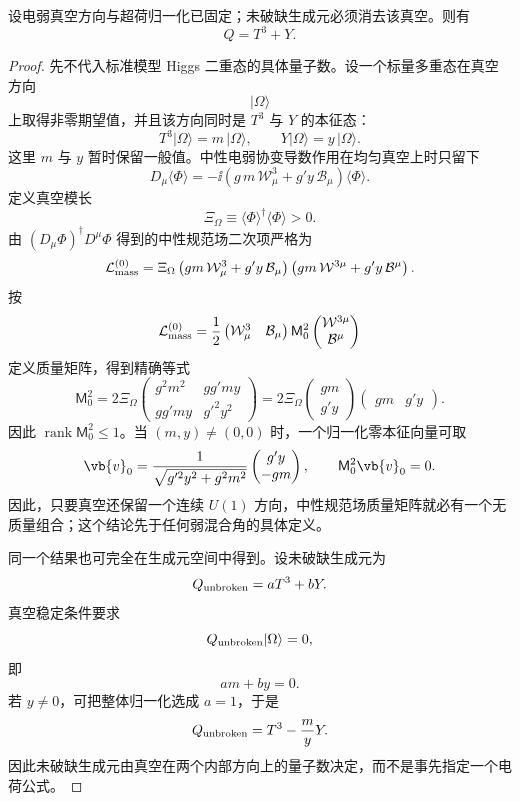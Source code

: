 \begin{proposition}[真空稳定子的电荷生成元]
设电弱真空方向与超荷归一化已固定；未破缺生成元必须消去该真空。则有
\begin{equation}
 {Q=T^3+Y.}
\label{eq:gm-nishijima-sm-dp11}
\end{equation}
\end{proposition}
\begin{proof}
先不代入标准模型 Higgs 二重态的具体量子数。设一个标量多重态在真空方向
\[
|\Omega\rangle
\]
上取得非零期望值，并且该方向同时是 \(T^3\) 与 \(Y\) 的本征态：
\[
T^3|\Omega\rangle
=
m\,|\Omega\rangle,
\qquad
Y|\Omega\rangle
=
y\,|\Omega\rangle.
\]
这里 \(m\) 与 \(y\) 暂时保留一般值。中性电弱协变导数作用在均匀真空上时只留下
\[
D_\mu\langle\Phi\rangle
=
-\ii
\left(
g\,m\,\mathcal W_\mu^3
+
g' y\,\mathcal B_\mu
\right)
\langle\Phi\rangle.
\]
定义真空模长
\[
\Xi_\Omega\equiv
\langle\Phi\rangle^\dagger\langle\Phi\rangle>0.
\]
由
\(
(D_\mu\Phi)^\dagger D^\mu\Phi
\)
得到的中性规范场二次项严格为
\[
\mathcal L_{\rm mass}^{(0)}
=\Xi_\Omega
\left(
gm\,\mathcal W_\mu^3+g'y\,\mathcal B_\mu
\right)
\left(
gm\,\mathcal W^{3\mu}+g'y\,\mathcal B^\mu
\right).
\]
按
\[
\mathcal L_{\rm mass}^{(0)}
=\frac12
\begin{pmatrix}\mathcal W_\mu^3&\mathcal B_\mu\end{pmatrix}
\mathsf M_0^2
\begin{pmatrix}\mathcal W^{3\mu}\\\mathcal B^\mu\end{pmatrix}
\]
定义质量矩阵，得到精确等式
\[
\mathsf M_0^2
=2\Xi_\Omega
\begin{pmatrix}
g^2m^2 & gg'my\\
gg'my & g'^2y^2
\end{pmatrix}
=2\Xi_\Omega
\begin{pmatrix}gm\\ g'y\end{pmatrix}
\begin{pmatrix}gm & g'y\end{pmatrix}.
\]
因此 $\operatorname{rank}\mathsf M_0^2\le1$。当 $(m,y)\neq(0,0)$ 时，一个归一化零本征向量可取
\[
\vb{v}_0
=\frac1{\sqrt{g'^2y^2+g^2m^2}}
\begin{pmatrix}
g'y\\-gm
\end{pmatrix},
\qquad
\mathsf M_0^2\vb{v}_0=0.
\]
因此，只要真空还保留一个连续 \(U(1)\) 方向，中性规范场质量矩阵就必有一个无质量组合；这个结论先于任何弱混合角的具体定义。

同一个结果也可完全在生成元空间中得到。设未破缺生成元为
\[
Q_{\rm unbroken}
=
aT^3+bY.
\]
真空稳定条件要求
\[
Q_{\rm unbroken}|\Omega\rangle=0,
\]
即
\[
am+by=0.
\]
若 \(y\neq0\)，可把整体归一化选成 \(a=1\)，于是
\[
{
Q_{\rm unbroken}
=
T^3-\frac{m}{y}Y.
}
\]
因此未破缺生成元由真空在两个内部方向上的量子数决定，而不是事先指定一个电荷公式。


\end{proof}
